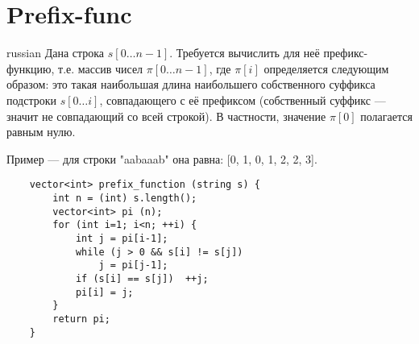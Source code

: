 \documentclass{article}
\begin{document}
\section{Prefix-func}
\begin{otherlanguage*}{russian}
    Дана строка $s[0 \ldots n-1]$. Требуется вычислить для неё префикс-функцию, т.е. массив чисел $\pi[0 \ldots n-1]$, где $\pi[i]$ определяется следующим образом: это такая наибольшая длина наибольшего собственного суффикса подстроки $s[0 \ldots i]$, совпадающего с её префиксом (собственный суффикс — значит не совпадающий со всей строкой). В частности, значение $\pi[0]$ полагается равным нулю.

    Пример — для строки "aabaaab" она равна: [0, 1, 0, 1, 2, 2, 3].
\end{otherlanguage*}
\begin{verbatim}
    vector<int> prefix_function (string s) {
        int n = (int) s.length();
        vector<int> pi (n);
        for (int i=1; i<n; ++i) {
            int j = pi[i-1];
            while (j > 0 && s[i] != s[j])
                j = pi[j-1];
            if (s[i] == s[j])  ++j;
            pi[i] = j;
        }
        return pi;
    }
\end{verbatim}
\end{document}
